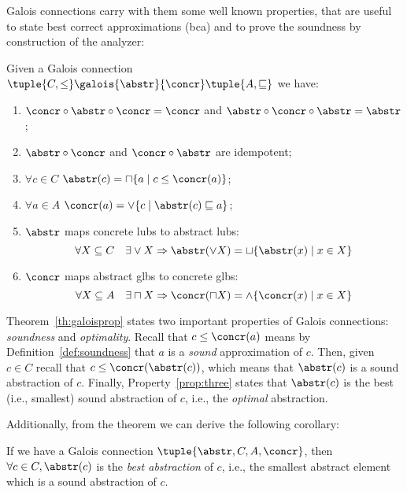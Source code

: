 Galois connections carry with them some well known properties, that
are useful to state best correct approximations (bca) and to prove the
soundness by construction of the analyzer:

\begin{theorem}\label{th:galoisprop}
  Given a Galois connection
  \(\tuple{C,\leq} \galois{\abstr}{\concr} \tuple{A, \sqsubseteq}\) we
  have:
  \begin{enumerate}
  \item \(\concr \circ \abstr \circ \concr = \concr\) and
    \(\abstr \circ \concr \circ \abstr = \abstr\);
  \item \(\abstr \circ \concr\) and \(\concr \circ \abstr\) are
    idempotent;
  \item\label{prop:three} \(\forall c \in C\)
    \(\abstr(c) = \sqcap \{a \mid c \leq \concr(a)\}\);
  \item\label{prop:four} \(\forall a \in A\)
    \(\concr(a) = \vee \{ c \mid \abstr(c) \sqsubseteq a \}\);
  \item\label{prop:five} \(\abstr\) maps concrete lubs to abstract lubs:
    \begin{equation*}
      \forall X \subseteq C \quad \exists \vee X \Rightarrow \abstr(\vee X) = \sqcup \{\abstr(x) \mid x \in X\}
    \end{equation*}
  \item \(\concr\) maps abstract glbs to concrete glbs:
    \begin{equation*}
      \forall X \subseteq A \quad \exists \sqcap X \Rightarrow \concr(\sqcap X) = \wedge \{\concr(x) \mid x \in X\}
    \end{equation*}
  \end{enumerate}
\end{theorem}

Theorem~\ref{th:galoisprop} states two important properties of Galois
connections: \emph{soundness} and \emph{optimality}. Recall that
\(c \leq \concr(a)\) means by Definition~\ref{def:soundness} that
\(a\) is a \emph{sound} approximation of \(c\). Then, given
\(c \in C\) recall that \(c \leq \concr(\abstr(c))\), which means that
\(\abstr(c)\) is a sound abstraction of \(c\). Finally,
Property~\ref{prop:three} states that \(\abstr(c)\) is the best (i.e.,
smallest) sound abstraction of \(c\), i.e., the \emph{optimal}
abstraction.

Additionally, from the theorem we can derive the
following corollary:

\begin{corollary}\label{co:bestabstr}
  If we have a Galois connection \(\tuple{\abstr, C, A, \concr}\),
  then \(\forall c \in C, \abstr(c)\) is the \emph{best abstraction}
  of \(c\), i.e., the smallest abstract element which is a sound
  abstraction of \(c\).
\end{corollary}

